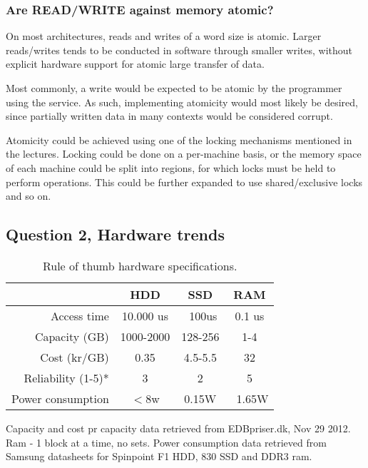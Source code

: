 \documentclass[11pt,a4paper]{article}
\begin{document}
\subsubsection{Are READ/WRITE against memory atomic?}
On most architectures, reads and writes of a word size is atomic. Larger 
reads/writes tends to be conducted in software through smaller writes,
without explicit hardware support for atomic large transfer of data.

Most commonly, a write would be expected to be atomic by the programmer using
the service. As such, implementing atomicity would most likely be desired, since
partially written data in many contexts would be considered corrupt.

Atomicity could be achieved using one of the locking mechanisms mentioned
in the lectures. Locking could be done on a per-machine basis, or the
memory space of each machine could be split into regions, for which locks
must be held to perform operations. This could be further expanded to use
shared/exclusive locks and so on.

\subsection{Question 2, Hardware trends}

\begin{table}[h!]
    \centering

    \begin{tabular}{|r|c|c|c|}
        \hline
                        & HDD & SSD & RAM\\\hline
        Access time     & 10.000 us & ~100us & 0.1 us\\\hline %
        Capacity (GB)   & 1000-2000 & 128-256 & 1-4 \\\hline
        Cost (kr/GB)    & 0.35 & 4.5-5.5 & 32 \\\hline
        Reliability (1-5)*& 3 & 2 & 5\\\hline %
        Power consumption & $<$8w & 0.15W & ~1.65W \\\hline 
        
    \end{tabular}
    \caption{Rule of thumb hardware specifications.}
\end{table}
Capacity and cost pr capacity data retrieved from EDBpriser.dk, Nov 29 2012.
Ram - 1 block at a time, no sets. Power consumption data retrieved from Samsung datasheets for
Spinpoint F1 HDD, 830 SSD and DDR3 ram.
\end{document}
